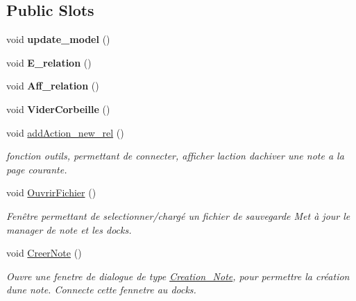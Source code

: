 \subsection*{Public Slots}
\begin{DoxyCompactItemize}
\item 
\mbox{\label{classinterface_afb97d08561d883c718da0fd638c7f77f}} 
void {\bfseries update\+\_\+model} ()
\item 
\mbox{\label{classinterface_a0f50f64c70556ffcd16c9073d885e5c3}} 
void {\bfseries E\+\_\+relation} ()
\item 
\mbox{\label{classinterface_a8ac5467a589ab5af2e91056edafa7707}} 
void {\bfseries Aff\+\_\+relation} ()
\item 
\mbox{\label{classinterface_a2e950dd5e3f8937e1147f4f3d696fc40}} 
void {\bfseries Vider\+Corbeille} ()
\item 
\mbox{\label{classinterface_afda8f97b198f7d434cb1eb2d845dfefc}} 
void \hyperlink{classinterface_afda8f97b198f7d434cb1eb2d845dfefc}{add\+Action\+\_\+new\+\_\+rel} ()
\begin{DoxyCompactList}\small\item\em fonction outils, permettant de connecter, afficher l\textquotesingle{}action d\textquotesingle{}achiver une note a la page courante. \end{DoxyCompactList}\item 
void \hyperlink{classinterface_af42d8f6426ad19ce13f1dd2ce9f519c1}{Ouvrir\+Fichier} ()
\begin{DoxyCompactList}\small\item\em Fenêtre permettant de selectionner/chargé un fichier de sauvegarde Met à jour le manager de note et les docks. \end{DoxyCompactList}\item 
void \hyperlink{classinterface_a23957135caad59d8850fe8e2cbee28a3}{Creer\+Note} ()
\begin{DoxyCompactList}\small\item\em Ouvre une fenetre de dialogue de type \hyperlink{class_creation___note}{Creation\+\_\+\+Note}, pour permettre la création d\textquotesingle{}une note. Connecte cette fennetre au docks. \end{DoxyCompactList}\item 

\end{DoxyCompactItemize}
